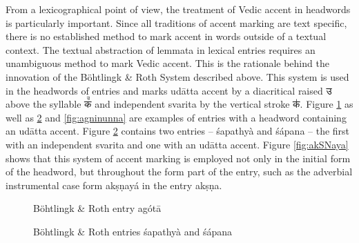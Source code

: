 From a lexicographical point of view, the treatment of Vedic accent in headwords is particularly important. Since all traditions of accent marking are text specific, there is no established method to mark accent in words outside of a textual context. The textual abstraction of lemmata in lexical entries requires an unambiguous method to mark Vedic accent. This is the rationale behind the innovation of the Böhtlingk \& Roth System described above. This system is used in the headwords of entries and marks udātta accent by a diacritical raised {\devfont उ} above the syllable {\devfont क꣫} and independent svarita by the vertical stroke {\devfont क॑}. Figure \ref{fig:agotAfull} as well as \ref{fig:PWG-SapaTya} and \ref{fig:agninunna} are examples of entries with a headword containing an udātta accent. Figure \ref{fig:PWG-SapaTya} contains two entries – śapathyà and śápana – the first with an independent svarita and one with an udātta accent. Figure \ref{fig:akSNaya} shows that this system of accent marking is employed not only in the initial form of the headword, but throughout the form part of the entry, such as the adverbial instrumental case form akṣṇayá in the entry akṣṇa.


\begin{figure}[!ht]
\begin{center}
\end{center}
\caption[Böhtlingk \& Roth entry agótā]{\label{fig:agotAfull}Böhtlingk \& Roth entry agótā}
\end{figure}

\begin{figure}[!ht]
\begin{center}
\end{center}
\caption[Böhtlingk \& Roth entries śapathyà and śápana]{\label{fig:PWG-SapaTya}Böhtlingk \& Roth entries śapathyà and śápana}
\end{figure}

